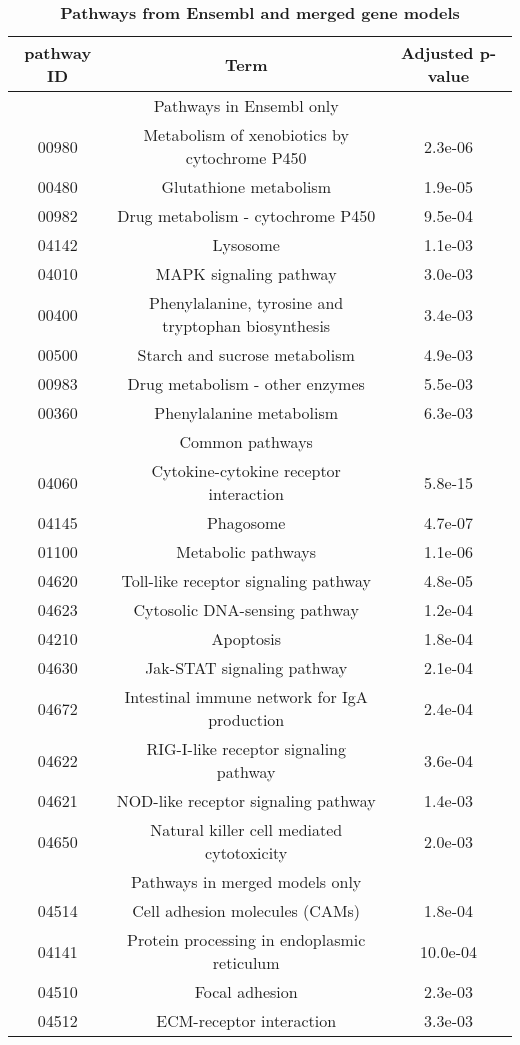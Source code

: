\begin{table}[!ht]
\caption{
\textbf{Pathways from Ensembl and merged gene models}}
\begin{center}
\begin{tabular}{ccc}
\hline
pathway ID & Term & Adjusted p-value \\
\hline
& Pathways in Ensembl only & \\
\hline
00980 & Metabolism of xenobiotics by cytochrome P450 & 2.3e-06 \\
00480 & Glutathione metabolism & 1.9e-05 \\
00982 & Drug metabolism - cytochrome P450 & 9.5e-04 \\
04142 & Lysosome & 1.1e-03 \\
04010 & MAPK signaling pathway & 3.0e-03 \\
00400 & Phenylalanine, tyrosine and tryptophan biosynthesis & 3.4e-03 \\
00500 & Starch and sucrose metabolism & 4.9e-03 \\
00983 & Drug metabolism - other enzymes & 5.5e-03 \\
00360 & Phenylalanine metabolism & 6.3e-03 \\
\hline
& Common pathways & \\
\hline
04060 & Cytokine-cytokine receptor interaction & 5.8e-15 \\
04145 & Phagosome & 4.7e-07 \\
01100 & Metabolic pathways & 1.1e-06 \\
04620 & Toll-like receptor signaling pathway & 4.8e-05 \\
04623 & Cytosolic DNA-sensing pathway & 1.2e-04 \\
04210 & Apoptosis & 1.8e-04 \\
04630 & Jak-STAT signaling pathway & 2.1e-04 \\
04672 & Intestinal immune network for IgA production & 2.4e-04 \\
04622 & RIG-I-like receptor signaling pathway & 3.6e-04 \\
04621 & NOD-like receptor signaling pathway & 1.4e-03 \\
04650 & Natural killer cell mediated cytotoxicity & 2.0e-03 \\
\hline
& Pathways in merged models only & \\
\hline
04514 & Cell adhesion molecules (CAMs) & 1.8e-04 \\
04141 & Protein processing in endoplasmic reticulum & 10.0e-04 \\
04510 & Focal adhesion & 2.3e-03 \\
04512 & ECM-receptor interaction & 3.3e-03 \\
\hline
\end{tabular}
\end{center}
\begin{flushleft}
\end{flushleft}
\label{tab:combined_unique}
\end{table}

